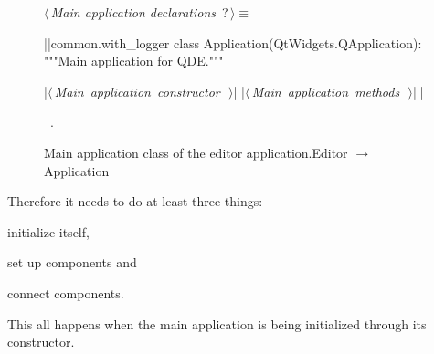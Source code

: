 \documentclass[%
    a4paper,    %
    justified,  %
    nobib,      %
    openany     %
]{tufte-book}
\begin{document}
\begin{figure}[h]
  \begin{flushleft} \small
\begin{minipage}{\linewidth}\label{scrap12}\raggedright\small
{} $\langle\,${\itshape Main application declarations}\nobreak\ {\footnotesize {?}}$\,\rangle\equiv$
\vspace{-1ex}
\begin{pythoncode}
|\normalfont{}\fontfamily{}|common.with_logger
class Application(QtWidgets.QApplication):
    """Main application for QDE."""

    |\hbox{$\langle\,${\itshape Main application constructor}\nobreak\ {\footnotesize {}}$\,\rangle$}|
    |\hbox{$\langle\,${\itshape Main application methods}\nobreak\ {\footnotesize {}}$\,\rangle$}||\NWsep|
\end{pythoncode}
\vspace{1.5ex}
\footnotesize
\begin{list}{}{\setlength{\itemsep}{-\parsep}\setlength{\itemindent}{-\leftmargin}}
\item \NWtxtMacroRefIn\ .

\item{}
\end{list}
\end{minipage}\vspace{4ex}
\end{flushleft}
\caption{Main application class of the editor
    application.\newline{}\newline{}Editor $\rightarrow$ Application}
  \label{editor:lst:app}
\end{figure}

Therefore it needs to do at least three things:
\begin{enumerate*}
  \item initialize itself,
  \item set up components and
  \item connect components.
  \end{enumerate*}
This all happens when the main application is being initialized through its
constructor.
\end{document}
